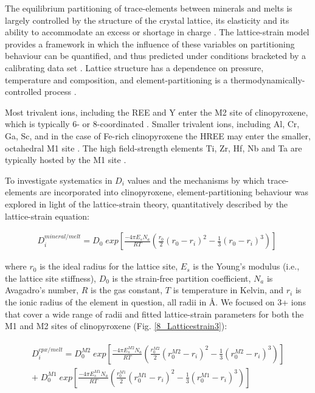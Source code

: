 \documentclass[final,authoryear,3p,times,twocolumn]{elsarticle}
\begin{document}
The equilibrium partitioning of trace-elements between minerals and melts is largely controlled by the structure of the crystal lattice, its elasticity \citep{Onuma1968, Kumazawa1969, Weidner1982} and its ability to accommodate an excess or shortage in charge \citep{Blundy1998, Wood2001charge, Hanchar2001, Corgne2005CMP}. The lattice-strain model provides a framework in which the influence of these variables on partitioning behaviour can be quantified, and thus predicted under conditions bracketed by a calibrating data set \citep{Onuma1968, Blundy1994, Wood2014}. Lattice structure has a dependence on pressure, temperature and composition, and element-partitioning is a thermodynamically-controlled process \citep[e.g.][]{Wood1997}.

Most trivalent ions, including the REE and Y enter the M2 site of clinopyroxene, which is typically 6- or 8-coordinated \citep{Deer1992}. Smaller trivalent ions, including Al, Cr, Ga, Sc, and in the case of Fe-rich clinopyroxene the HREE may enter the smaller, octahedral M1 site \citep{Olin2010, Bedard2014}. The high field-strength elements Ti, Zr, Hf, Nb and Ta are typically hosted by the M1 site \citep{Hill2000, Hill2011, Dygert2014}.

To investigate systematics in $D_i$ values and the mechanisms by which trace-elements are incorporated into clinopyroxene, element-partitioning behaviour was explored in light of the lattice-strain theory, quantitatively described by the lattice-strain equation: 

	\begin{align} %
	   D_i^{mineral/melt} = D_0 \; exp \left[\frac{-4\pi E_sN_a}{RT} \left(\frac{r_0}{2}(r_0-r_i)^2-\frac{1}{3}(r_0-r_i)^3\right)\right]\
	   \label{LST_eqn}
	\end{align}
	
\noindent where $r_0$ is the ideal radius for the lattice site, $E_s$ is the Young's modulus (i.e., the lattice site stiffness), $D_0$ is the strain-free partition coefficient, $N_a$ is Avagadro's number, $R$ is the gas constant, $T$ is temperature in Kelvin, and $r_i$ is the ionic radius of the element in question, all radii in \si{\angstrom}. We focused on 3+ ions that cover a wide range of radii and fitted lattice-strain parameters for both the M1 and M2 sites of clinopyroxene (Fig. \ref{8_Latticestrain3}):
		
	\begin{align} %
	\begin{split}
	   D_i^{cpx/melt} = D_0^{M2} \; exp \left[\frac{-4\pi E_s^{M2} N_a}{RT} \left(\frac{r_0^{M2}}{2}(r_0^{M2}-r_i)^2-\frac{1}{3}(r_0^{M2}-r_i)^3\right)\right] \\
  + \; D_0^{M1} \; exp \left[\frac{-4\pi E_s^{M1} N_a}{RT} \left(\frac{r_0^{M1}}{2}(r_0^{M1}-r_i)^2-\frac{1}{3}(r_0^{M1}-r_i)^3\right)\right]\
	\end{split}
	\label{LST_eqn_cpx}
	\end{align}
	
\end{document}
